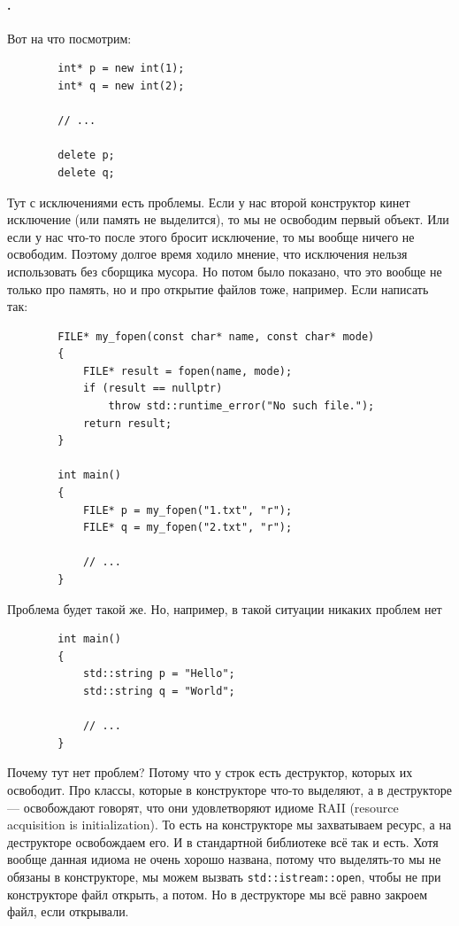 \documentclass{article}
\begin{document}
    \paragraph{.}
    Вот на что посмотрим:
    \begin{verbatim}
        int* p = new int(1);
        int* q = new int(2);

        // ...

        delete p;
        delete q;
    \end{verbatim}
    Тут с исключениями есть проблемы. Если у нас второй конструктор кинет исключение (или память не выделится), то мы не освободим первый объект. Или если у нас что-то после этого бросит исключение, то мы вообще ничего не освободим. Поэтому долгое время ходило мнение, что исключения нельзя использовать без сборщика мусора. Но потом было показано, что это вообще не только про память, но и про открытие файлов тоже, например. Если написать так:
    \begin{verbatim}
        FILE* my_fopen(const char* name, const char* mode)
        {
            FILE* result = fopen(name, mode);
            if (result == nullptr)
                throw std::runtime_error("No such file.");
            return result;
        }

        int main()
        {
            FILE* p = my_fopen("1.txt", "r");
            FILE* q = my_fopen("2.txt", "r");

            // ...
        }
    \end{verbatim}
    Проблема будет такой же. Но, например, в такой ситуации никаких проблем нет
    \begin{verbatim}
        int main()
        {
            std::string p = "Hello";
            std::string q = "World";
            
            // ...
        }
    \end{verbatim}
    Почему тут нет проблем? Потому что у строк есть деструктор, которых их освободит. Про классы, которые в конструкторе что-то выделяют, а в деструкторе --- освобождают говорят, что они удовлетворяют идиоме RAII (resource acquisition is initialization). То есть на конструкторе мы захватываем ресурс, а на деструкторе освобождаем его. И в стандартной библиотеке всё так и есть. Хотя вообще данная идиома не очень хорошо названа, потому что выделять-то мы не обязаны в конструкторе, мы можем вызвать \texttt{std::istream::open}, чтобы не при конструкторе файл открыть, а потом. Но в деструкторе мы всё равно закроем файл, если открывали.
\end{document}
